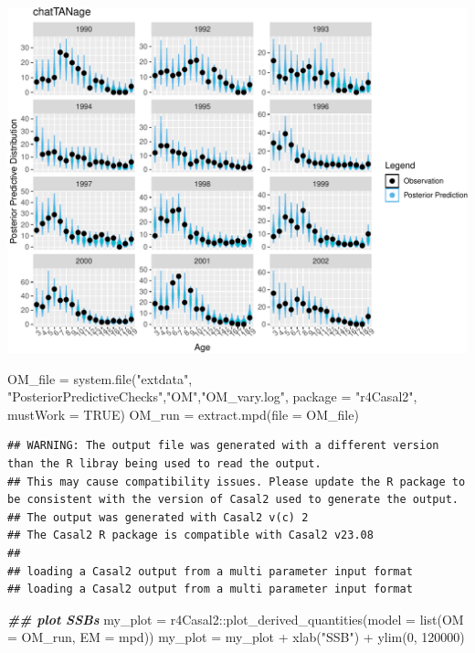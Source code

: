 \documentclass[
]{book}
\newenvironment{Shaded}{\begin{snugshade}}{\end{snugshade}}
\newcommand{\AttributeTok}[1]{\textcolor[rgb]{0.77,0.63,0.00}{#1}}
\newcommand{\ConstantTok}[1]{\textcolor[rgb]{0.00,0.00,0.00}{#1}}
\newcommand{\DecValTok}[1]{\textcolor[rgb]{0.00,0.00,0.81}{#1}}
\newcommand{\DocumentationTok}[1]{\textcolor[rgb]{0.56,0.35,0.01}{\textbf{\textit{#1}}}}
\newcommand{\FunctionTok}[1]{\textcolor[rgb]{0.00,0.00,0.00}{#1}}
\newcommand{\NormalTok}[1]{#1}
\newcommand{\OtherTok}[1]{\textcolor[rgb]{0.56,0.35,0.01}{#1}}
\newcommand{\SpecialCharTok}[1]{\textcolor[rgb]{0.00,0.00,0.00}{#1}}
\newcommand{\StringTok}[1]{\textcolor[rgb]{0.31,0.60,0.02}{#1}}
\begin{document}
\includegraphics{_main_files/figure-latex/ggplots_ppp-2.pdf}

\begin{Shaded}
\begin{Highlighting}[]
\NormalTok{OM\_file }\OtherTok{=} \FunctionTok{system.file}\NormalTok{(}\StringTok{"extdata"}\NormalTok{, }\StringTok{"PosteriorPredictiveChecks"}\NormalTok{,}\StringTok{"OM"}\NormalTok{,}\StringTok{"OM\_vary.log"}\NormalTok{, }\AttributeTok{package =} \StringTok{"r4Casal2"}\NormalTok{, }\AttributeTok{mustWork =} \ConstantTok{TRUE}\NormalTok{)}
\NormalTok{OM\_run }\OtherTok{=} \FunctionTok{extract.mpd}\NormalTok{(}\AttributeTok{file =}\NormalTok{ OM\_file)}
\end{Highlighting}
\end{Shaded}

\begin{verbatim}
## WARNING: The output file was generated with a different version than the R libray being used to read the output.
## This may cause compatibility issues. Please update the R package to be consistent with the version of Casal2 used to generate the output.
## The output was generated with Casal2 v(c) 2
## The Casal2 R package is compatible with Casal2 v23.08
## 
## loading a Casal2 output from a multi parameter input format
## loading a Casal2 output from a multi parameter input format
\end{verbatim}

\begin{Shaded}
\begin{Highlighting}[]
\DocumentationTok{\#\# plot SSBs}
\NormalTok{my\_plot }\OtherTok{=}\NormalTok{ r4Casal2}\SpecialCharTok{::}\FunctionTok{plot\_derived\_quantities}\NormalTok{(}\AttributeTok{model =} \FunctionTok{list}\NormalTok{(}\AttributeTok{OM =}\NormalTok{ OM\_run, }\AttributeTok{EM =}\NormalTok{ mpd))}
\NormalTok{my\_plot }\OtherTok{=}\NormalTok{ my\_plot }\SpecialCharTok{+} \FunctionTok{xlab}\NormalTok{(}\StringTok{"SSB"}\NormalTok{) }\SpecialCharTok{+} \FunctionTok{ylim}\NormalTok{(}\DecValTok{0}\NormalTok{, }\DecValTok{120000}\NormalTok{)}
\end{Highlighting}
\end{Shaded}
\end{document}
